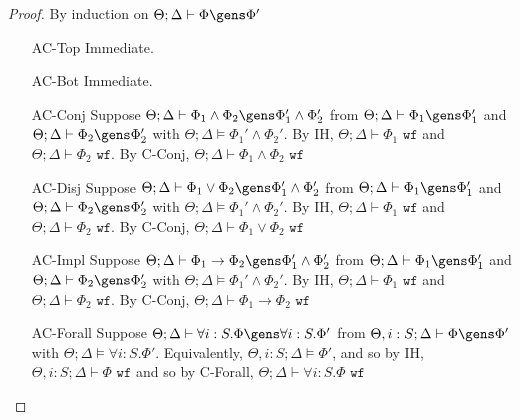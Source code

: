 \begin{proof}
By induction on $\Theta ; \Delta \vdash \Phi \gens \Phi'$
\begin{itemize}
 \item[AC-Top] Immediate.
 \item[AC-Bot] Immediate.
 \item[AC-Conj] Suppose $\Theta;\Delta \vdash \Phi_1 \wedge \Phi_2 \gens \Phi_1' \wedge \Phi_2'$ from $\Theta ; \Delta \vdash \Phi_1 \gens \Phi_1'$ and $ \Theta ; \Delta \vdash \Phi_2 \gens \Phi_2'$ with $\Theta ; \Delta \vDash \Phi_1' \wedge \Phi_2'$. By IH, $\Theta ; \Delta \vdash \Phi_1 \texttt{ wf}$ and $\Theta ; \Delta \vdash \Phi_2 \texttt{ wf}$. By C-Conj, $\Theta;\Delta \vdash \Phi_1 \wedge \Phi_2 \texttt{ wf}$
 \item[AC-Disj]Suppose $\Theta;\Delta \vdash \Phi_1 \vee \Phi_2 \gens \Phi_1' \wedge \Phi_2'$ from $\Theta ; \Delta \vdash \Phi_1 \gens \Phi_1'$ and $ \Theta ; \Delta \vdash \Phi_2 \gens \Phi_2'$ with $\Theta ; \Delta \vDash \Phi_1' \wedge \Phi_2'$. By IH, $\Theta ; \Delta \vdash \Phi_1 \texttt{ wf}$ and $\Theta ; \Delta \vdash \Phi_2 \texttt{ wf}$. By C-Conj, $\Theta;\Delta \vdash \Phi_1 \vee \Phi_2 \texttt{ wf}$
 \item[AC-Impl] Suppose $\Theta;\Delta \vdash \Phi_1 \to \Phi_2 \gens \Phi_1' \wedge \Phi_2'$ from $\Theta ; \Delta \vdash \Phi_1 \gens \Phi_1'$ and $ \Theta ; \Delta \vdash \Phi_2 \gens \Phi_2'$ with $\Theta ; \Delta \vDash \Phi_1' \wedge \Phi_2'$. By IH, $\Theta ; \Delta \vdash \Phi_1 \texttt{ wf}$ and $\Theta ; \Delta \vdash \Phi_2 \texttt{ wf}$. By C-Conj, $\Theta;\Delta \vdash \Phi_1 \to \Phi_2 \texttt{ wf}$
 \item[AC-Forall] Suppose $\Theta ; \Delta \vdash \forall i : S. \Phi \gens \forall i : S. \Phi'$
 from $\Theta, i : S ; \Delta \vdash \Phi \gens \Phi'$ with $\Theta ; \Delta \vDash \forall i : S. \Phi'$. Equivalently, $\Theta , i : S; \Delta \vDash \Phi'$, and so by IH, $\Theta, i : S ; \Delta \vdash \Phi \texttt{ wf}$ and so by C-Forall, $\Theta ; \Delta \vdash \forall i : S. \Phi \texttt{ wf}$
 

\end{itemize}
\end{proof}
